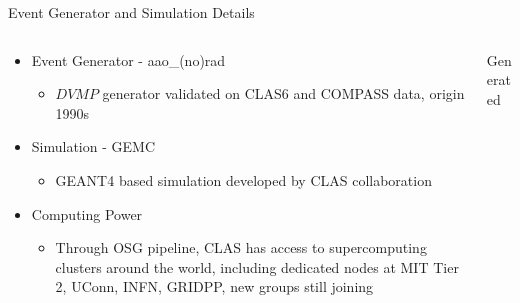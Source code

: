 \documentclass[aspectratio=169]{beamer}
\begin{document}
\begin{frame}{Event Generator and Simulation Details}
     \begin{columns}[c]
               \begin{column}{0.5\textwidth}

                    \begin{itemize}
                        \item Event Generator - aao\_(no)rad
                            \begin{itemize}
                                \item  $DVMP$ generator validated on CLAS6 and COMPASS data, origin 1990s
                            \end{itemize}
                        \item Simulation - GEMC
                            \begin{itemize}
                                \item GEANT4 based simulation developed by CLAS collaboration
                            \end{itemize}
                        \item Computing Power
                            \begin{itemize}
                                \item Through OSG pipeline, CLAS has access to supercomputing clusters around the world, including dedicated nodes at MIT Tier 2, UConn, INFN, GRIDPP, new groups still joining
                            \end{itemize}
                    \end{itemize}
                    \end{column}
                    
                    
    \begin{column}{0.5\textwidth}
                
                \centering Generated \\
        \begin{columns}
                    
                             

\end{columns}
\end{column}
\end{columns}
\end{frame}
\end{document}
